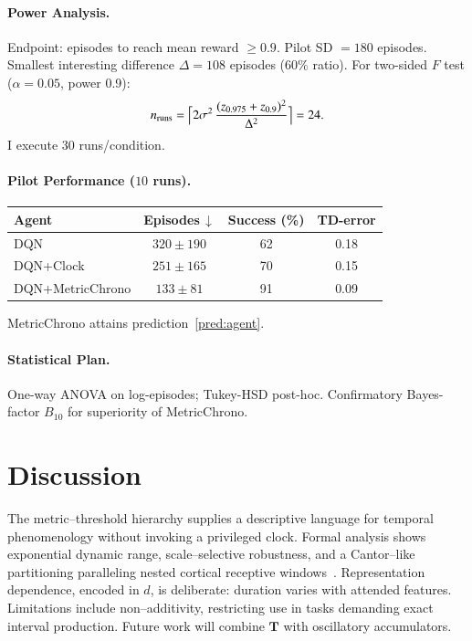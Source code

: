 \documentclass[preprint,11pt]{elsarticle}
\begin{document}
\paragraph{Power Analysis.}
Endpoint: episodes to reach mean reward $\ge 0.9$.
Pilot SD $=180$ episodes.  Smallest interesting difference
$\Delta=108$ episodes ($60\%$ ratio).  For two-sided
$F$ test ($\alpha=0.05$, power 0.9):
\[
n_{\mathrm{runs}}=\Bigl\lceil
    2\sigma^2 \,
    \frac{(z_{0.975}+z_{0.9})^2}{\Delta^2}
\Bigr\rceil = 24.
\]
I execute 30 runs/condition.

\paragraph{Pilot Performance ($10$ runs).}
\begin{center}
\begin{tabular}{lccc}
\toprule
Agent & Episodes\,$\downarrow$ & Success (\%) & TD-error \\
\midrule
DQN & $320\pm190$ & 62 & 0.18 \\
DQN+Clock & $251\pm165$ & 70 & 0.15 \\
DQN+MetricChrono & $133\pm81$ & 91 & 0.09 \\
\bottomrule
\end{tabular}
\end{center}
MetricChrono attains prediction~\ref{pred:agent}.

\paragraph{Statistical Plan.}
One-way ANOVA on log-episodes; Tukey-HSD post-hoc.  Confirmatory
Bayes-factor $B_{10}$ for superiority of MetricChrono.

\section{Discussion}
The metric--threshold hierarchy supplies a descriptive language for
temporal phenomenology without invoking a privileged clock.  Formal
analysis shows exponential dynamic range, scale--selective robustness,
and a Cantor--like partitioning paralleling nested cortical receptive
windows~\citep{hasson2008hierarchical}.  Representation dependence,
encoded in $d$, is deliberate: duration varies with attended features.
Limitations include non--additivity, restricting use in tasks demanding
exact interval production.  Future work will combine $\mathbf T$ with
oscillatory accumulators.
\end{document}
